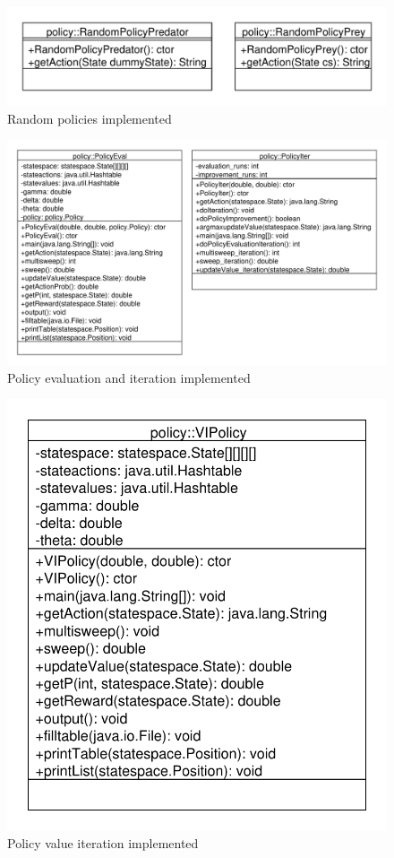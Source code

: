 \documentclass[paper=a4, fontsize=11pt]{scrartcl}
\numberwithin{equation}{section}		%
\numberwithin{figure}{section}			%
\numberwithin{table}{section}				%
\begin{document}
\begin{figure}[H] \centering
\includegraphics[scale=0.6]{uml_policies1.pdf}
\caption{Random policies implemented} \label{Policies1}
\end{figure}
\begin{figure}[H] \centering
\includegraphics[scale=0.6]{uml_policies2.pdf}
\caption{Policy evaluation and iteration implemented} \label{Policies2}
\end{figure}
\begin{figure}[H] \centering
\includegraphics[scale=0.58]{uml_policies3.pdf}
\caption{Policy value iteration implemented} \label{Policies3}
\end{figure}
\end{document}

